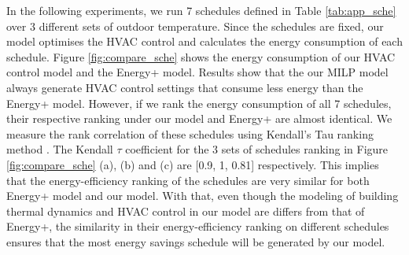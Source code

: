 In the following experiments, we run 7 schedules defined in Table \ref{tab:app_sche} over 3 different sets of outdoor temperature. Since the schedules are fixed, our model optimises the HVAC control and calculates the energy consumption of each schedule. Figure \ref{fig:compare_sche} shows the energy consumption of our HVAC control model and the Energy+ model. Results show that the our MILP model always generate HVAC control settings that consume less energy than the Energy+ model. However, if we rank the energy consumption of all 7 schedules, their respective ranking under our model and Energy+ are almost identical. We measure the rank correlation of these schedules using Kendall's Tau ranking method \citep{daniel1990applied}. The Kendall $\tau$ coefficient for the 3 sets of schedules ranking in Figure \ref{fig:compare_sche} (a), (b) and (c) are [0.9, 1, 0.81] respectively. This implies that the energy-efficiency ranking of the schedules are very similar for both Energy+ model and our model. With that, even though the modeling of building thermal dynamics and HVAC control in our model are differs from that of Energy+, the similarity in their energy-efficiency ranking on different schedules ensures that the most energy savings schedule will be generated by our model. 

